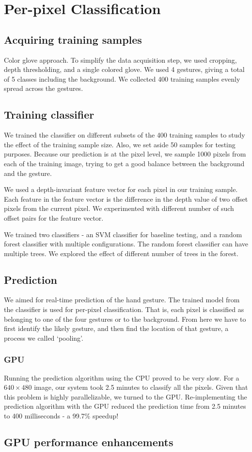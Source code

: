 \section{Per-pixel Classification}

\subsection{Acquiring training samples}
Color glove approach. To simplify the data acquisition step, we used cropping, depth thresholding, and a single colored glove. We used 4 gestures, giving a total of 5 classes including the background. We collected 400 training samples evenly spread across the gestures.  

\subsection{Training classifier}
We trained the classifier on different subsets of the 400 training samples to study the effect of the training sample size. Also, we set aside 50 samples for testing purposes. Because our prediction is at the pixel level, we sample 1000 pixels from each of the training image, trying to get a good balance between the background and the gesture.

We used a depth-invariant feature vector for each pixel in our training sample. Each feature in the feature vector is the difference in the depth value of two offset pixels from the current pixel. We experimented with different number of such offset pairs for the feature vector.

We trained two classifiers - an SVM classifier for baseline testing, and a random forest classifier with multiple configurations. The random forest classifier can have multiple trees. We explored the effect of different number of trees in the forest.

\subsection{Prediction}
We aimed for real-time prediction of the hand gesture. The trained model from the classifier is used for per-pixel classification. That is, each pixel is classified as belonging to one of the four gestures or to the background. From here we have to first identify the likely gesture, and then find the location of that gesture, a process we called `pooling'. 

\subsubsection{GPU} Running the prediction algorithm using the CPU proved to be very slow. For a $640\times480$ image, our system took 2.5 minutes to classify all the pixels. Given that this problem is highly parallelizable, we turned to the GPU. Re-implementing the prediction algorithm with the GPU reduced the prediction time from 2.5 minutes to 400 milliseconds - a 99.7\% speedup!


\subsection{GPU performance enhancements}